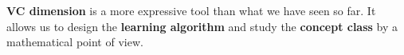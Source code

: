 \textbf{VC dimension} is a more expressive tool than what we have seen so far. It allows us to design the \textbf{learning algorithm} and study the \textbf{concept 
class} by a mathematical point of view.